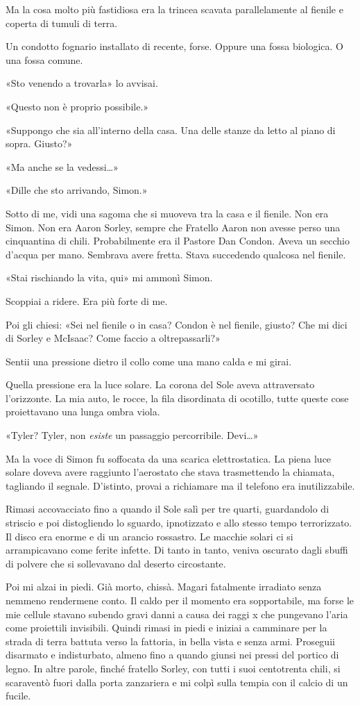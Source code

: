 Ma la cosa molto più fastidiosa era la trincea scavata parallelamente al
fienile e coperta di tumuli di terra.

Un condotto fognario installato di recente, forse. Oppure una fossa
biologica. O una fossa comune.

«Sto venendo a trovarla» lo avvisai.

«Questo non è proprio possibile.»

«Suppongo che sia all'interno della casa. Una delle stanze da letto al
piano di sopra. Giusto?»

«Ma anche se la vedessi\ldots»

«Dille che sto arrivando, Simon.»

Sotto di me, vidi una sagoma che si muoveva tra la casa e il fienile.
Non era Simon. Non era Aaron Sorley, sempre che Fratello Aaron non
avesse perso una cinquantina di chili. Probabilmente era il Pastore Dan
Condon. Aveva un secchio d'acqua per mano. Sembrava avere fretta. Stava
succedendo qualcosa nel fienile.

«Stai rischiando la vita, qui» mi ammonì Simon.

Scoppiai a ridere. Era più forte di me.

Poi gli chiesi: «Sei nel fienile o in casa? Condon è nel fienile,
giusto? Che mi dici di Sorley e McIsaac? Come faccio a oltrepassarli?»

Sentii una pressione dietro il collo come una mano calda e mi girai.

Quella pressione era la luce solare. La corona del Sole aveva
attraversato l'orizzonte. La mia auto, le rocce, la fila disordinata di
ocotillo, tutte queste cose proiettavano una lunga ombra viola.

«Tyler? Tyler, non \emph{esiste} un passaggio percorribile. Devi\ldots»

Ma la voce di Simon fu soffocata da una scarica elettrostatica. La piena
luce solare doveva avere raggiunto l'aerostato che stava trasmettendo la
chiamata, tagliando il segnale. D'istinto, provai a richiamare ma il
telefono era inutilizzabile.

Rimasi accovacciato fino a quando il Sole salì per tre quarti,
guardandolo di striscio e poi distogliendo lo sguardo, ipnotizzato e
allo stesso tempo terrorizzato. Il disco era enorme e di un arancio
rossastro. Le macchie solari ci si arrampicavano come ferite infette. Di
tanto in tanto, veniva oscurato dagli sbuffi di polvere che si
sollevavano dal deserto circostante.

Poi mi alzai in piedi. Già morto, chissà. Magari fatalmente irradiato
senza nemmeno rendermene conto. Il caldo per il momento era
sopportabile, ma forse le mie cellule stavano subendo gravi danni a
causa dei raggi x che pungevano l'aria come proiettili invisibili.
Quindi rimasi in piedi e iniziai a camminare per la strada di terra
battuta verso la fattoria, in bella vista e senza armi. Proseguii
disarmato e indisturbato, almeno fino a quando giunsi nei pressi del
portico di legno. In altre parole, finché fratello Sorley, con tutti i
suoi centotrenta chili, si scaraventò fuori dalla porta zanzariera e mi
colpì sulla tempia con il calcio di un fucile.

